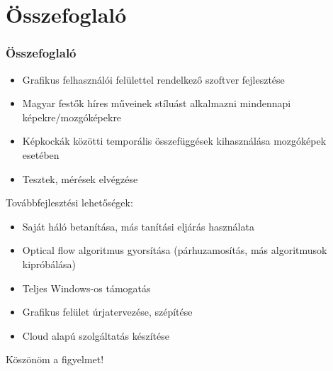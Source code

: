 \documentclass{beamer}
\begin{document}
	\section{Összefoglaló}
	
	\begin{frame}
		\frametitle{Összefoglaló}
		\begin{itemize}
			\item Grafikus felhasználói felülettel rendelkező szoftver fejlesztése
			\item Magyar festők híres műveinek stíluást alkalmazni mindennapi képekre/mozgóképekre
			\item Képkockák közötti temporális összefüggések kihasználása mozgóképek esetében
			\item Tesztek, mérések elvégzése
		\end{itemize}
		
		\vspace{0.5cm}
		Továbbfejlesztési lehetőségek:
		\begin{itemize}
			\item Saját háló betanítása, más tanítási eljárás használata
			\item Optical flow algoritmus gyorsítása (párhuzamosítás, más algoritmusok kipróbálása)
			\item Teljes Windows-os támogatás
			\item Grafikus felület úrjatervezése, szépítése
			\item Cloud alapú szolgáltatás készítése
		\end{itemize}
		\vspace{0.5cm}
		\begin{center}
			Köszönöm a figyelmet!
		\end{center}
	\end{frame}
	
	
\end{document}
